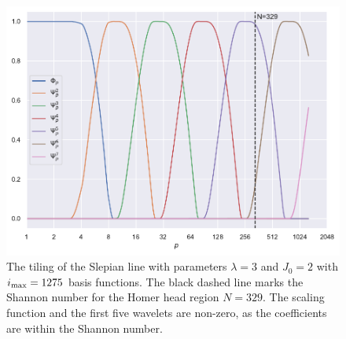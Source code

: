 \begin{figure}[htpb]
    \centering\capstart{}
    \includegraphics[width=\textwidth]{homer_slepian_tiling_b1275.pdf}
    \caption[
        The tiling of the Slepian line for the Homer head region
    ]{
        The tiling of the Slepian line with parameters \(\lambda=3\) and \(J_{0}=2\) with \(i_{\text{max}}=\num{1275}\) basis functions.
        The black dashed line marks the Shannon number for the Homer head region \(N=329\).
        The scaling function and the first five wavelets are non-zero, as the coefficients are within the Shannon number.
    }\label{fig:chapter5_tiling}
\end{figure}
